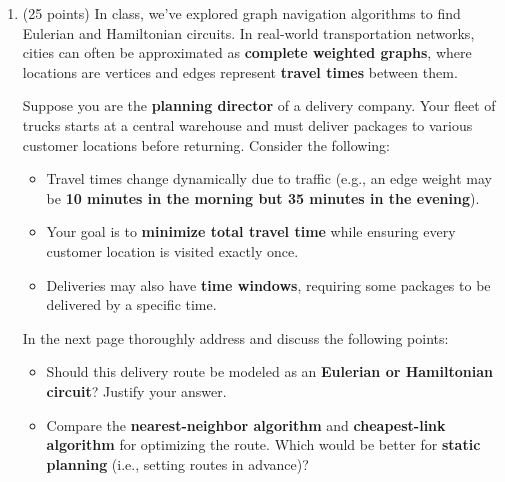 \documentclass[12pt]{exam}
\begin{document}
\begin{enumerate}
\iffalse
Sol:
\begin{enumerate}
    \item A walk starts and ends at different places whereas a circuit begins and ends at the same place.
    \item Eulerian means that edges are the object of interest to traverse, while Hamiltonian means that the vertices are the traversed ones.
    \item Any path graph.
    \item A path graph with any pair of middle vertices connected.
    \item Two triangles joined at a vertex, say a ribbon.
    \item The ribbon graph again.
    \item A cycle with more than four vertices with any two non-adjacent vertices connected.
\end{enumerate}
\fi
\newpage
\item (25 points) In class, we've explored graph navigation algorithms to find Eulerian and Hamiltonian circuits. In real-world transportation networks, cities can often be approximated as \textbf{complete weighted graphs}, where locations are vertices and edges represent \textbf{travel times} between them.\par
Suppose you are the \textbf{planning director} of a delivery company. Your fleet of trucks starts at a central warehouse and must deliver packages to various customer locations before returning. Consider the following:  
\begin{itemize}
    \item Travel times change dynamically due to traffic (e.g., an edge weight may be \textbf{10 minutes in the morning but 35 minutes in the evening}).  
    \item Your goal is to \textbf{minimize total travel time} while ensuring every customer location is visited exactly once.  
    \item Deliveries may also have \textbf{time windows}, requiring some packages to be delivered by a specific time.  
\end{itemize}
In the next page thoroughly address and discuss the following points:
\begin{itemize}
    \item Should this delivery route be modeled as an \textbf{Eulerian or Hamiltonian circuit}? Justify your answer.  
    \item Compare the \textbf{nearest-neighbor algorithm} and \textbf{cheapest-link algorithm} for optimizing the route. Which would be better for \textbf{static planning} (i.e., setting routes in advance)?  

\end{itemize}
\end{enumerate}
\end{document}
